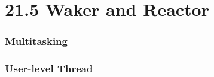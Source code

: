 \section{21.5 Waker and Reactor} %
\begin{frame}[fragile]
    \frametitle{Multitasking}
\end{frame}
% 
% 
% 
% 
% 
% 
\begin{frame}[fragile]
    \frametitle{User-level Thread}
\end{frame}
% 
